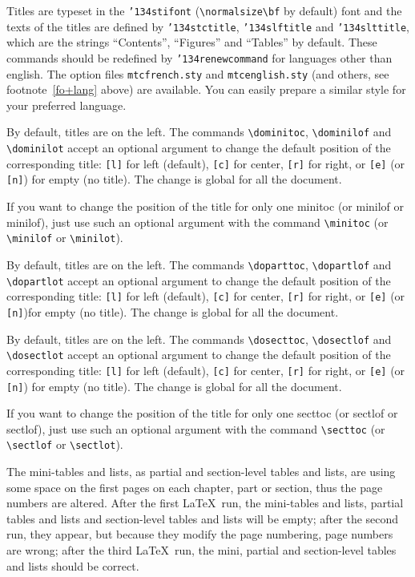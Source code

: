 \documentclass[12pt,a4paper]{book}
\def\bs{{\tt\char'134}}
\begin{document}
Titles are typeset in the {\tt\bs stifont} (\verb|\normalsize\bf| by
default) font and the texts of the titles are defined by
{\tt\bs stctitle}, {\tt\bs slftitle} and {\tt\bs slttitle}, which
are the strings ``Contents'',
``Figures'' and ``Tables'' by default.
These commands should be redefined by {\tt\bs renewcommand} for
languages other than english.
The option files
{\tt mtcfrench.sty} and {\tt mtcenglish.sty} (and others, see
footnote~\ref{fo+lang} above) are available.
You can easily prepare a similar style for your preferred language.

By default, titles are on the left. The commands \verb|\dominitoc|,
\verb|\dominilof| and \verb|\dominilot| accept an optional argument
to change the default position of the
corresponding title: {\tt [l]} for left (default), {\tt [c]} for center,
{\tt [r]} for right, or {\tt [e]} (or {\tt[n]}) for empty (no title).
The change is global for all the document.

If you want to change the position of the title for only one minitoc
(or minilof or minilof), just use such an optional argument with the
command \verb|\minitoc| (or \verb|\minilof| or \verb|\minilot|).

By default, titles are on the left. The commands \verb|\doparttoc|,
\verb|\dopartlof| and \verb|\dopartlot| accept an optional argument
to change the default position of the
corresponding title: {\tt [l]} for left (default), {\tt [c]} for center,
{\tt [r]} for right, or {\tt [e]} (or {\tt[n]})for empty (no title).
The change is global for all the document.

By default, titles are on the left. The commands \verb|\dosecttoc|,
\verb|\dosectlof| and \verb|\dosectlot| accept an optional argument
to change the default position of the
corresponding title: {\tt [l]} for left (default), {\tt [c]} for center,
{\tt [r]} for right, or {\tt [e]} (or {\tt[n]}) for empty (no title).
The change is global for all the document.

If you want to change the position of the title for only one secttoc
(or sectlof or sectlof), just use such an optional argument with the
command \verb|\secttoc| (or \verb|\sectlof| or \verb|\sectlot|).

The mini-tables and lists, as partial and section-level tables and lists,
are using some space on the first pages on each chapter, part or section,
thus the page numbers are altered. After the first \LaTeX\ run, the
mini-tables and lists, partial tables and lists
and section-level tables and lists
will be empty; after the second run, they appear,
but because they modify the page numbering, page numbers
are wrong; after the third \LaTeX\ run, the mini, partial and section-level
tables and lists should be correct.
\end{document}
